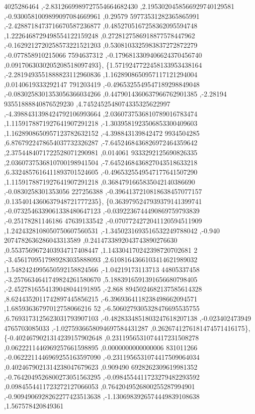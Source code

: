 \begin{DoxyCode}
      4025286464 ,-2.8312669989727554664682430 ,2.1953020458566929740129581 ,-0.9300581009899097084669961 ,0.29579
      59773531282365865991 ,-2.4288718473716670587236877 ,0.4852705167258362095594748 ,1.2226468729498554122159248
       ,0.2728127586918877578447962 ,-0.1629212720258573221521203 ,0.5308103325983837272872279 ,-0.077858910215066
      7594637312 ,-0.1796813309406624370456740 ,0.0917063030205208518097493\},
\{1.5719247722458133953438164 ,-2.2819493551888823112960836 ,1.1628908650957117121294004 ,0.0140619333292147
      791203419 ,-0.4965325549547189298849048 ,-0.0830258301353056366034266 ,0.4479014360637966762901385 ,-2.28194
      93551888840876529230 ,4.7452452548074335325622997 ,-4.3988431398424792106993664 ,2.0360737536810789016783474
       ,1.1159178871927641907291218 ,-1.3039581923506853300409603 ,1.1628908650957123782632152 ,-4.398843139842472
      9934504285 ,6.8767922478654037732326287 ,-7.6452468436826972464359642 ,2.3754484071722528071290981 ,0.014061
      9333292125690826335 ,2.0360737536810700198941504 ,-7.6452468436827043518633218 ,6.3324857616411893701524605 
      ,-0.4965325549547177641507290 ,1.1159178871927641907291218 ,0.3684791665835042140386690 ,-0.0830258301353056
      227256388 ,-0.3964137210818638457077157 ,0.1354014360637948721777235\},
\{0.3639795247939379141399741 ,-0.0732546339061338480647123 ,-0.0392236744490869759793839 ,-0.25178281146186
      47639133542 ,-0.0707724272041120594511909 ,1.2424328108050750607560531 ,-1.3450231693516532249788042 ,-0.940
      2074782636286043313589 ,0.2414733892043743890276630 ,0.5537569672403934717408447 ,1.143304170242398720702681
      2 ,-3.4561709517989283035888093 ,2.6108164366103414621989032 ,1.5482424995650592158824566 ,-1.04219173113713
      44805337458 ,-3.2576634641749824261580670 ,5.1883916591391656680798405 ,-2.4527816554139048044191895 ,-2.868
      8945024682137585614328 ,8.6244352011742897445856215 ,-6.3969364118238498662094571 ,1.68593636797012758066216
      52 ,-6.5060279305328476695535755 ,6.7693173125623031793907103 ,-0.4828334851803247618207138 ,-0.023402473949
      4765703085033 ,-1.0275936658094697584431287 ,0.2626741276181474571416175\},
\{-0.4024679021314239157902648 ,0.2311956531074417231508278 ,0.0622211446969257661598895 ,0.0000000000000006
      831011266 ,-0.0622211446969255163597090 ,-0.2311956531074417509064034 ,0.4024679021314238047679623 ,0.909490
      6928262309619981352 ,-0.7642049526800273051563295 ,-0.0984554411723279482293592 ,0.0984554411723272127066053
       ,0.7642049526800255287994901 ,-0.9094906928262277423513638 ,-1.1306983926574449839108638 ,1.567578420849361

\end{DoxyCode}
